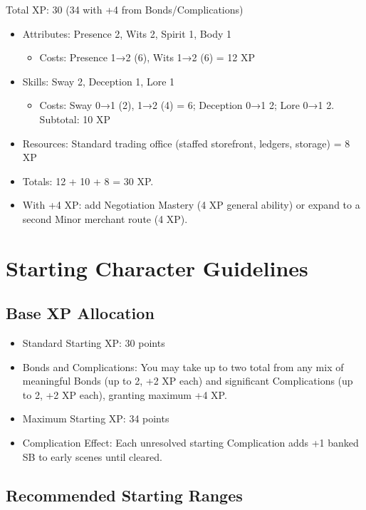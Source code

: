 \documentclass[11pt,twoside,openany]{book}
\begin{document}
Total XP: 30 (34 with +4 from Bonds/Complications)

\begin{itemize}
\item Attributes: Presence 2, Wits 2, Spirit 1, Body 1
\begin{itemize}
\item Costs: Presence 1→2 (6), Wits 1→2 (6) = 12 XP
\end{itemize}
\item Skills: Sway 2, Deception 1, Lore 1
\begin{itemize}
\item Costs: Sway 0→1 (2), 1→2 (4) = 6; Deception 0→1 2; Lore 0→1 2. Subtotal: 10 XP
\end{itemize}
\item Resources: Standard trading office (staffed storefront, ledgers, storage) = 8 XP
\item Totals: 12 + 10 + 8 = 30 XP.
\item With +4 XP: add Negotiation Mastery (4 XP general ability) or expand to a second Minor merchant route (4 XP).
\end{itemize}

\section*{Starting Character Guidelines} 

\subsection*{Base XP Allocation}

\begin{itemize}
\item Standard Starting XP: 30 points
\item Bonds and Complications: You may take up to two total from any mix of meaningful Bonds (up to 2, +2 XP each) and significant Complications (up to 2, +2 XP each), granting maximum +4 XP.
\item Maximum Starting XP: 34 points
\item Complication Effect: Each unresolved starting Complication adds +1 banked SB to early scenes until cleared.
\end{itemize}

\subsection*{Recommended Starting Ranges}
\end{document}
